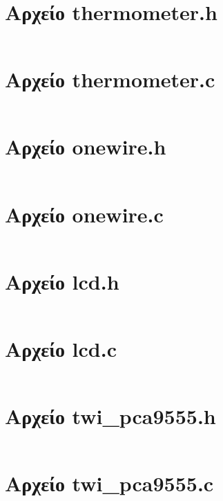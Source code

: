 \documentclass[a4paper]{article}
\begin{document}
\inputminted[breaklines, linenos]{basemake}{../Lab7.2/Makefile}

\pagebreak

\appendix

\section{Αρχείο thermometer.h}
\label{thermometer_h}
\inputminted[breaklines, linenos]{c}{../common/thermometer.h}

\section{Αρχείο thermometer.c}
\label{thermometer_c}
\inputminted[breaklines, linenos]{c}{../common/thermometer.c}

\section{Αρχείο onewire.h}
\label{onewire_h}
\inputminted[breaklines, linenos]{c}{../common/onewire.h}

\section{Αρχείο onewire.c}
\label{onewire_c}
\inputminted[breaklines, linenos]{c}{../common/onewire.c}

\section{Αρχείο lcd.h}
\label{lcd_h}
\inputminted[breaklines, linenos]{c}{../common/lcd.h}

\section{Αρχείο lcd.c}
\label{lcd_c}
\inputminted[breaklines, linenos]{c}{../common/lcd.c}

\section{Αρχείο twi\_pca9555.h}
\label{twi_pca9555_h}
\inputminted[breaklines, linenos]{c}{../common/twi_pca9555.h}

\section{Αρχείο twi\_pca9555.c}
\label{twi_pca9555_c}
\inputminted[breaklines, linenos]{c}{../common/twi_pca9555.c}
\end{document}
